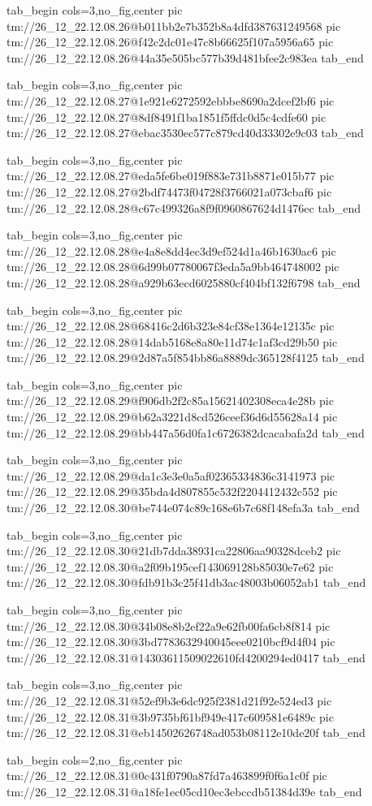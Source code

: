 \ifcmt
  tab_begin cols=3,no_fig,center
    pic tm://26_12_22.12.08.26@b011bb2e7b352b8a4dfd387631249568
    pic tm://26_12_22.12.08.26@f42c2dc01e47c8b66625f107a5956a65
    pic tm://26_12_22.12.08.26@44a35e505bc577b39d481bfee2c983ea
  tab_end
\fi


\ifcmt
  tab_begin cols=3,no_fig,center
    pic tm://26_12_22.12.08.27@1e921e6272592ebbbe8690a2dcef2bf6
    pic tm://26_12_22.12.08.27@8df8491f1ba1851f5ffdc0d5c4cdfe60
    pic tm://26_12_22.12.08.27@ebac3530ec577c879cd40d33302e9c03
  tab_end
\fi


\ifcmt
  tab_begin cols=3,no_fig,center
    pic tm://26_12_22.12.08.27@eda5fe6be019f883e731b8871e015b77
    pic tm://26_12_22.12.08.27@2bdf74473f04728f3766021a073cbaf6
    pic tm://26_12_22.12.08.28@c67c499326a8f9f0960867624d1476ec
  tab_end
\fi


\ifcmt
  tab_begin cols=3,no_fig,center
    pic tm://26_12_22.12.08.28@e4a8e8dd4ec3d9ef524d1a46b1630ac6
    pic tm://26_12_22.12.08.28@6d99b07780067f3eda5a9bb464748002
    pic tm://26_12_22.12.08.28@a929b63ecd6025880cf404bf132f6798
  tab_end
\fi


\ifcmt
  tab_begin cols=3,no_fig,center
    pic tm://26_12_22.12.08.28@68416c2d6b323e84cf38e1364e12135c
    pic tm://26_12_22.12.08.28@14dab5168e8a80e11d74c1af3cd29b50
    pic tm://26_12_22.12.08.29@2d87a5f854bb86a8889dc365128f4125
  tab_end
\fi


\ifcmt
  tab_begin cols=3,no_fig,center
    pic tm://26_12_22.12.08.29@f906db2f2c85a15621402308eca4e28b
    pic tm://26_12_22.12.08.29@b62a3221d8cd526ceef36d6d55628a14
    pic tm://26_12_22.12.08.29@bb447a56d0fa1c6726382dcacabafa2d
  tab_end
\fi


\ifcmt
  tab_begin cols=3,no_fig,center
    pic tm://26_12_22.12.08.29@da1c3e3e0a5af02365334836c3141973
    pic tm://26_12_22.12.08.29@35bda4d807855c532f2204412432c552
    pic tm://26_12_22.12.08.30@be744e074c89c168e6b7c68f148efa3a
  tab_end
\fi


\ifcmt
  tab_begin cols=3,no_fig,center
    pic tm://26_12_22.12.08.30@21db7dda38931ca22806aa90328dceb2
    pic tm://26_12_22.12.08.30@a2f09b195cef143069128b85030e7e62
    pic tm://26_12_22.12.08.30@fdb91b3c25f41db3ac48003b06052ab1
  tab_end
\fi


\ifcmt
  tab_begin cols=3,no_fig,center
    pic tm://26_12_22.12.08.30@34b08e8b2ef22a9e62fb00fa6cb8f814
    pic tm://26_12_22.12.08.30@3bd7783632940045eee0210bcf9d4f04
    pic tm://26_12_22.12.08.31@14303611509022610fd4200294ed0417
  tab_end
\fi


\ifcmt
  tab_begin cols=3,no_fig,center
    pic tm://26_12_22.12.08.31@52ef9b3e6dc925f2381d21f92e524ed3
    pic tm://26_12_22.12.08.31@3b9735bf61bf949e417c609581e6489c
    pic tm://26_12_22.12.08.31@eb14502626748ad053b08112e10de20f
  tab_end
\fi


\ifcmt
  tab_begin cols=2,no_fig,center
    pic tm://26_12_22.12.08.31@0c431f0790a87fd7a463899f0f6a1c0f
    pic tm://26_12_22.12.08.31@a18fe1ec05cd10ec3ebccdb51384d39e
  tab_end
\fi

